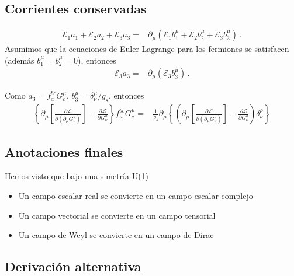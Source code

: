 \subsection{Corrientes conservadas}

\begin{align}
  \mathcal{E}_1 a_1 + \mathcal{E}_2 a_2 + \mathcal{E}_3 a_3=& \partial_{\mu} \left( \mathcal{E}_1 b_1^{\mu} + \mathcal{E}_2 b_2^{\mu} + \mathcal{E}_3 b_3^{\mu}   \right) \,.
\end{align}
Asumimos que la ecuaciones de Euler Lagrange para los fermiones se satisfacen (además $b_1^{\mu}=b_2^{\mu}=0$), entonces
\begin{align}
   \mathcal{E}_3 a_3=& \partial_{\mu} \left(  \mathcal{E}_3 b_3^{\mu}   \right) \,.
\end{align}

Como $a_{3}=f_{a}^{bc} G^{\mu}_{c} $, $b_{3}^{\mu}=\delta^{\mu}_{\nu}/g_{s}$, entonces
\begin{align}
  \left\{ \partial_\mu\left[\frac{\partial\mathcal{L}}{\partial\left(\partial_\mu G_\nu^a\right)}\right]-\frac{\partial\mathcal{L}}{\partial G_\nu^a} \right\} f_{a}^{bc} G^{\mu}_{c} =&
\frac{1}{g_s}\partial_{\mu} \left\{\left(   \partial_\mu\left[\frac{\partial\mathcal{L}}{\partial\left(\partial_\mu G_\nu^a\right)}\right]-\frac{\partial\mathcal{L}}{\partial G_\nu^a} \right)\delta_{\nu}^{\rho}  \right\}
\end{align}

\subsection{Anotaciones finales}


Hemos visto que bajo una simetría U(1)
\begin{itemize}
 \item Un campo escalar real se convierte en un campo escalar complejo
\item Un campo vectorial se convierte en un campo tensorial
\item Un campo de Weyl se convierte en un campo de Dirac
\end{itemize}




\subsection{Derivación alternativa}






